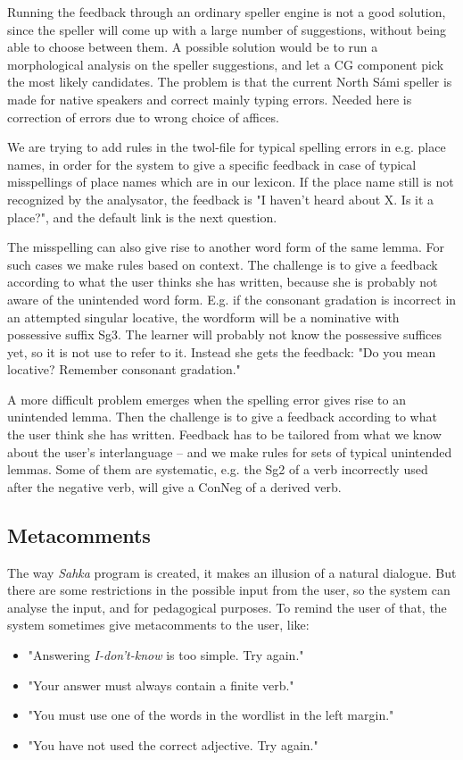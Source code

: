 \documentclass[11pt]{article}
\begin{document}
Running the feedback through an ordinary speller engine is not a good solution, since the speller will come up with a large number of suggestions, without being able to choose between them. A possible solution would be to run a morphological analysis on the speller suggestions, and let a CG component pick the most likely candidates. The problem is that the current North Sámi speller is made for native speakers and correct mainly typing errors. Needed here is correction of errors due to wrong choice of affices.

We are trying to add rules in the twol-file for typical spelling errors in e.g. place names, in order for the system to give a specific feedback in case of typical misspellings of place names which are in our lexicon. If the place name still is not recognized by the analysator, the feedback is "I haven’t heard about X. Is it a 
place?", and the default link is the next question.

The misspelling can also give rise to another word form of the same lemma. For such cases we make rules based on context. The challenge is to give a feedback according to what the user thinks she has written, because she is probably not aware of the unintended word form. E.g. if the consonant gradation is incorrect in an attempted singular locative, the wordform will be a nominative with possessive suffix Sg3. The learner will probably not know the possessive suffices yet, so it is not use to refer to it. Instead she gets the feedback: "Do you mean locative? Remember consonant gradation." 

A more difficult problem emerges when the spelling error gives rise to an unintended lemma. Then the challenge is to give a feedback according to what the user think she has written. Feedback has to be tailored from what we know about the user’s interlanguage – and we make rules for sets of typical unintended lemmas. Some of them are systematic, e.g. the Sg2 of a verb incorrectly used after the negative verb, will give a ConNeg of a derived verb.  


\subsection{Metacomments}
The way \textit{Sahka} program is created, it makes an illusion of a natural dialogue. But there are some restrictions in the possible input from the user, so the system can analyse the input, and for pedagogical purposes. To remind the user of that, the system sometimes give metacomments to the user, like:
\begin{itemize}
\setlength{\itemsep}{-0.2cm}
\item "Answering \textit{I-don't-know} is too simple. Try again."
\item "Your answer must always contain a finite verb."
\item "You must use one of the words in the wordlist in the left margin."
\item "You have not used the correct adjective. Try again."
\end{itemize}
\end{document}
